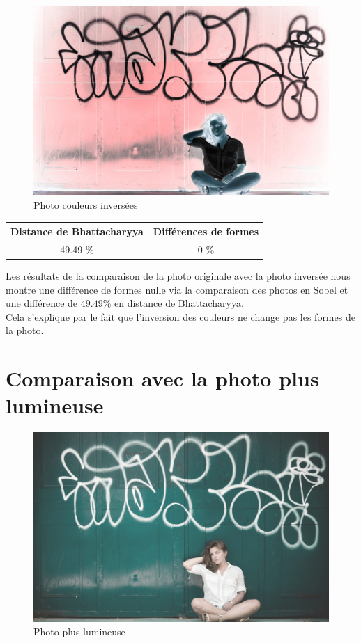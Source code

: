 \documentclass[]{article}
\begin{document}
\begin{figure}[htbp]
\centering
\includegraphics{photos/inverse.jpg}
\caption{Photo couleurs inversées}
\end{figure}

\begin{center}
\begin{tabular}{|c|c|}
  \hline
  Distance de Bhattacharyya & Différences de formes \\
  \hline
  49.49 \% & 0 \% \\
  \hline
\end{tabular}
\end{center}


Les résultats de la comparaison de la photo originale avec la photo
inversée nous montre une différence de formes nulle via la comparaison
des photos en Sobel et une différence de $49.49 \%$ en distance de
Bhattacharyya. \\
Cela s'explique par le fait que l'inversion des couleurs ne change pas les
formes de la photo.

\newpage

\section{Comparaison avec la photo plus
lumineuse}\label{comparaison-avec-la-photo-plus-lumineuse}

\begin{figure}[htbp]
\centering
\includegraphics{photos/lumineux.jpg}
\caption{Photo plus lumineuse}
\end{figure}
\end{document}
